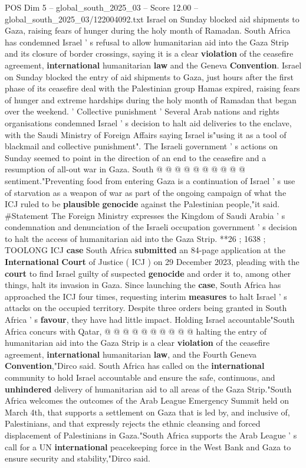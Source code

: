 \begin{textsample}{POS Dim 5 – global\_south\_2025\_03 – Score 12.00 – global\_south\_2025\_03/122004092.txt}  \label{ex:f5_pos_189}
Israel on Sunday blocked aid shipments to Gaza, raising fears of hunger during the holy month of Ramadan.
South Africa has condemned Israel ' s refusal to allow humanitarian aid into the Gaza Strip and its closure of border crossings, saying it is a clear \textbf{violation} of the ceasefire agreement, \textbf{international} humanitarian \textbf{law} and the Geneva \textbf{Convention}.
Israel on Sunday blocked the entry of aid shipments to Gaza, just hours after the first phase of its ceasefire deal with the Palestinian group Hamas expired, raising fears of hunger and extreme hardships during the holy month of Ramadan that began over the weekend. ' Collective punishment ' Several Arab nations and rights organisations condemned Israel ' s decision to halt aid deliveries to the enclave, with the Saudi Ministry of Foreign Affairs saying Israel is"using it as a tool of blackmail and collective punishment".
The Israeli government ' s actions on Sunday seemed to point in the direction of an end to the ceasefire and a resumption of all-out war in Gaza.
South @ @ @ @ @ @ @ @ @ @ sentiment."Preventing food from entering Gaza is a continuation of Israel ' s use of starvation as a weapon of war as part of the ongoing campaign of what the ICJ ruled to be \textbf{plausible} \textbf{genocide} against the Palestinian people,"it said. \#Statement The Foreign Ministry expresses the Kingdom of Saudi Arabia ' s condemnation and denunciation of the Israeli occupation government ' s decision to halt the access of humanitarian aid into the Gaza Strip. **26 ; 1638 ; TOOLONG ICJ \textbf{case} South Africa \textbf{submitted} an 84-page application at the \textbf{International} \textbf{Court} of Justice ( ICJ ) on 29 December 2023, pleading with the \textbf{court} to find Israel guilty of suspected \textbf{genocide} and order it to, among other things, halt its invasion in Gaza.
Since launching the \textbf{case}, South Africa has approached the ICJ four times, requesting interim \textbf{measures} to halt Israel ' s attacks on the occupied territory.
Despite three orders being granted in South Africa ' s \textbf{favour}, they have had little impact.
Holding Israel accountable"South Africa concurs with Qatar, @ @ @ @ @ @ @ @ @ @ halting the entry of humanitarian aid into the Gaza Strip is a clear \textbf{violation} of the ceasefire agreement, \textbf{international} humanitarian \textbf{law}, and the Fourth Geneva \textbf{Convention},"Dirco said.
South Africa has called on the \textbf{international} community to hold Israel accountable and ensure the safe, continuous, and \textbf{unhindered} delivery of humanitarian aid to all areas of the Gaza Strip."South Africa welcomes the outcomes of the Arab League Emergency Summit held on March 4th, that supports a settlement on Gaza that is led by, and inclusive of, Palestinians, and that expressly rejects the ethnic cleansing and forced displacement of Palestinians in Gaza."South Africa supports the Arab League ' s call for a UN \textbf{international} peacekeeping force in the West Bank and Gaza to ensure security and stability,"Dirco said.


\end{textsample}
